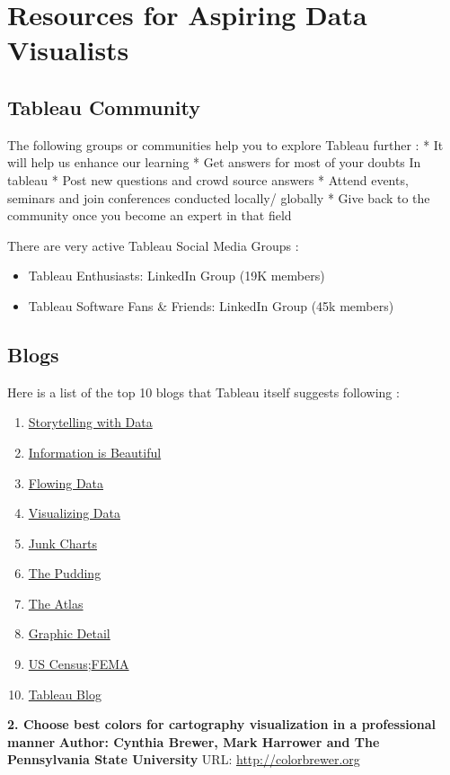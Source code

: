 \documentclass[]{book}
\providecommand{\tightlist}{%
  \setlength{\itemsep}{0pt}\setlength{\parskip}{0pt}}
\theoremstyle{definition}
\theoremstyle{definition}
\theoremstyle{definition}
\theoremstyle{remark}
\begin{document}
\section{Resources for Aspiring Data
Visualists}\label{resources-for-aspiring-data-visualists}

\subsection{Tableau Community}\label{tableau-community}

The following groups or communities help you to explore Tableau further
\citep{Tableau_Community}: * It will help us enhance our learning * Get
answers for most of your doubts In tableau * Post new questions and
crowd source answers * Attend events, seminars and join conferences
conducted locally/ globally * Give back to the community once you become
an expert in that field

There are very active Tableau Social Media Groups
\citep{LinkedIn_Groups}:

\begin{itemize}
\tightlist
\item
  Tableau Enthusiasts: LinkedIn Group (19K members)
\item
  Tableau Software Fans \& Friends: LinkedIn Group (45k members)
\end{itemize}

\subsection{Blogs}\label{blogs}

Here is a list of the top 10 blogs that Tableau itself suggests
following \citep{Top_10_Blogs}:

\begin{enumerate}
\def\labelenumi{\arabic{enumi}.}
\tightlist
\item
  \href{http://www.storytellingwithdata.com/}{Storytelling with Data}
\item
  \href{https://informationisbeautiful.net/}{Information is Beautiful}
\item
  \href{https://flowingdata.com/}{Flowing Data}
\item
  \href{http://www.visualisingdata.com/}{Visualizing Data}
\item
  \href{http://junkcharts.typepad.com/}{Junk Charts}
\item
  \href{https://pudding.cool/}{The Pudding}
\item
  \href{https://www.theatlas.com/}{The Atlas}
\item
  \href{https://www.economist.com/blogs/graphicdetail}{Graphic Detail}
\item
  \href{https://www.census.gov/dataviz/}{US
  Census};\href{https://www.fema.gov/data-visualization}{FEMA}
\item
  \href{https://www.tableau.com/about/blog}{Tableau Blog}
\end{enumerate}

\textbf{2. Choose best colors for cartography visualization in a
professional manner} \textbf{Author: Cynthia Brewer, Mark Harrower and
The Pennsylvania State University} URL: \url{http://colorbrewer.org}


\end{document}

